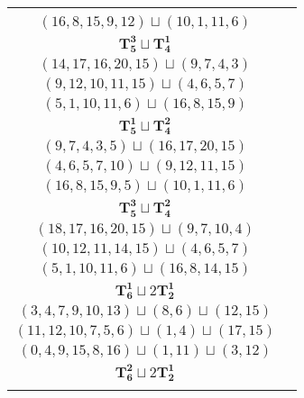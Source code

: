 \documentclass{article}
\begin{document}
\begin{longtable}{|c|c|}
\begin{tabular}{c}
        $(6,5,7,10,3)\sqcup(9,12,11,15)$ \\ 
        $(16,8,15,9,12)\sqcup(10,1,11,6)$
        \end{tabular} \\ 
        \hline
        $\mathbf{T_{5}^{3}} \sqcup \mathbf{T_{4}^{1}}$ & \begin{tabular}{c}
        $(13,15,16,18,14)\sqcup(11,9,6,7)$ \\ 
        $(14,17,16,20,15)\sqcup(9,7,4,3)$ \\ 
        $(9,12,10,11,15)\sqcup(4,6,5,7)$ \\ 
        $(5,1,10,11,6)\sqcup(16,8,15,9)$
        \end{tabular} \\ 
        \hline
        $\mathbf{T_{5}^{1}} \sqcup \mathbf{T_{4}^{2}}$ & \begin{tabular}{c}
        $(7,6,9,11,8)\sqcup(16,15,13,14)$ \\ 
        $(9,7,4,3,5)\sqcup(16,17,20,15)$ \\ 
        $(4,6,5,7,10)\sqcup(9,12,11,15)$ \\ 
        $(16,8,15,9,5)\sqcup(10,1,11,6)$
        \end{tabular} \\ 
        \hline
        $\mathbf{T_{5}^{3}} \sqcup \mathbf{T_{4}^{2}}$ & \begin{tabular}{c}
        $(13,15,16,18,14)\sqcup(11,9,12,6)$ \\ 
        $(18,17,16,20,15)\sqcup(9,7,10,4)$ \\ 
        $(10,12,11,14,15)\sqcup(4,6,5,7)$ \\ 
        $(5,1,10,11,6)\sqcup(16,8,14,15)$
        \end{tabular} \\ 
        \hline
        $\mathbf{T_{6}^{1}} \sqcup 2\mathbf{T_{2}^{1}}$ & \begin{tabular}{c}
        $(1,2,4,6,9,12)\sqcup(13,14)\sqcup(8,7)$ \\ 
        $(3,4,7,9,10,13)\sqcup(8,6)\sqcup(12,15)$ \\ 
        $(11,12,10,7,5,6)\sqcup(1,4)\sqcup(17,15)$ \\ 
        $(0,4,9,15,8,16)\sqcup(1,11)\sqcup(3,12)$
        \end{tabular} \\ 
        \hline
        $\mathbf{T_{6}^{2}} \sqcup 2\mathbf{T_{2}^{1}}$ & \begin{tabular}{c}
        $(1,2,4,6,9,5)\sqcup(13,14)\sqcup(8,7)$ \\ 

\end{tabular}
\end{longtable}
\end{document}
